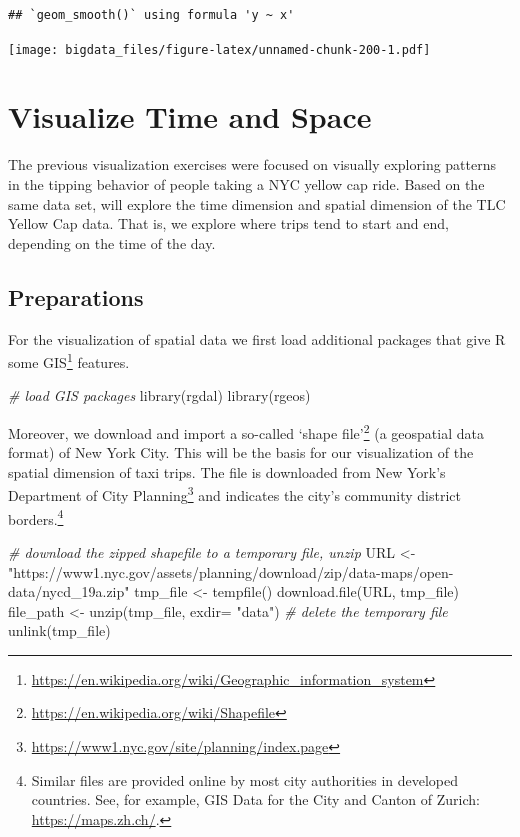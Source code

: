 \documentclass[
  12pt,
]{style/krantz}
\newenvironment{Shaded}{\begin{snugshade}}{\end{snugshade}}
\newcommand{\AttributeTok}[1]{\textcolor[rgb]{0.77,0.63,0.00}{#1}}
\newcommand{\CommentTok}[1]{\textcolor[rgb]{0.56,0.35,0.01}{\textit{#1}}}
\newcommand{\FunctionTok}[1]{\textcolor[rgb]{0.00,0.00,0.00}{#1}}
\newcommand{\NormalTok}[1]{#1}
\newcommand{\OtherTok}[1]{\textcolor[rgb]{0.56,0.35,0.01}{#1}}
\newcommand{\StringTok}[1]{\textcolor[rgb]{0.31,0.60,0.02}{#1}}
\renewcommand{\href}[2]{#2\footnote{\url{#1}}}
\begin{document}
\begin{verbatim}
## `geom_smooth()` using formula 'y ~ x'
\end{verbatim}

\texttt{[image: bigdata\_files/figure-latex/unnamed-chunk-200-1.pdf]}

\hypertarget{visualize-time-and-space}{%
\section{Visualize Time and Space}\label{visualize-time-and-space}}

The previous visualization exercises were focused on visually exploring patterns in the tipping behavior of people taking a NYC yellow cap ride. Based on the same data set, will explore the time dimension and spatial dimension of the TLC Yellow Cap data. That is, we explore where trips tend to start and end, depending on the time of the day.

\hypertarget{preparations}{%
\subsection{Preparations}\label{preparations}}

For the visualization of spatial data we first load additional packages that give R some \href{https://en.wikipedia.org/wiki/Geographic_information_system}{GIS} features.

\begin{Shaded}
\begin{Highlighting}[]
\CommentTok{\# load GIS packages}
\FunctionTok{library}\NormalTok{(rgdal)}
\FunctionTok{library}\NormalTok{(rgeos)}
\end{Highlighting}
\end{Shaded}

Moreover, we download and import a so-called \href{https://en.wikipedia.org/wiki/Shapefile}{`shape file'} (a geospatial data format) of New York City. This will be the basis for our visualization of the spatial dimension of taxi trips. The file is downloaded from \href{https://www1.nyc.gov/site/planning/index.page}{New York's Department of City Planning} and indicates the city's community district borders.\footnote{Similar files are provided online by most city authorities in developed countries. See, for example, GIS Data for the City and Canton of Zurich: \url{https://maps.zh.ch/}.}

\begin{Shaded}
\begin{Highlighting}[]
\CommentTok{\# download the zipped shapefile to a temporary file, unzip}
\NormalTok{URL }\OtherTok{\textless{}{-}} \StringTok{"https://www1.nyc.gov/assets/planning/download/zip/data{-}maps/open{-}data/nycd\_19a.zip"}
\NormalTok{tmp\_file }\OtherTok{\textless{}{-}} \FunctionTok{tempfile}\NormalTok{()}
\FunctionTok{download.file}\NormalTok{(URL, tmp\_file)}
\NormalTok{file\_path }\OtherTok{\textless{}{-}} \FunctionTok{unzip}\NormalTok{(tmp\_file, }\AttributeTok{exdir=} \StringTok{"data"}\NormalTok{)}
\CommentTok{\# delete the temporary file}
\FunctionTok{unlink}\NormalTok{(tmp\_file)}
\end{Highlighting}
\end{Shaded}
\end{document}
